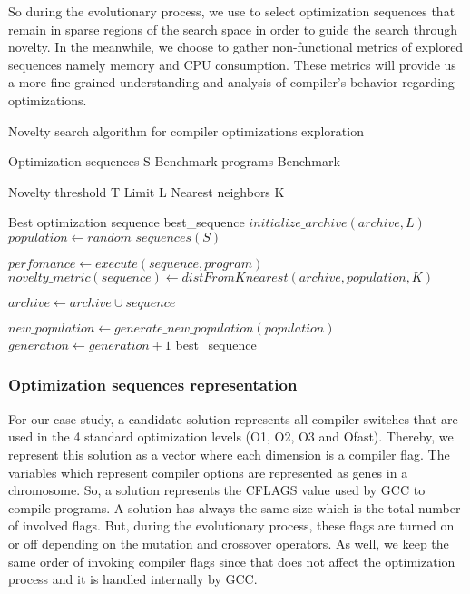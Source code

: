 So during the evolutionary process, we use to select optimization sequences that remain in sparse regions of the search space in order to guide the search through novelty. In the meanwhile, we choose to gather non-functional metrics of explored sequences namely memory and CPU consumption. These metrics will provide us a more fine-grained understanding and analysis of compiler's behavior regarding optimizations. 
\begin{algorithm}
	\caption{Novelty search algorithm for compiler optimizations exploration}
	\label{alg1}
	\begin{algorithmic}[1]
		\REQUIRE Optimization sequences S
		\REQUIRE Benchmark programs Benchmark
		
		\REQUIRE Novelty threshold T
		\REQUIRE Limit L
		\REQUIRE Nearest neighbors K
		
		\ENSURE Best optimization sequence best\_sequence
		\STATE $initialize\_archive(archive,L)$
		\STATE $population \gets random\_sequences(S)$
		\REPEAT
		
		\STATE 	$perfomance \gets execute(sequence,program)$
		\ENDFOR
		\STATE	$novelty\_metric(sequence) \gets distFromKnearest(archive,population,K)$
		
		\STATE	$archive \gets archive \cup sequence$
		\ENDIF
		
		\ENDFOR
		
		\STATE		$new\_population \gets generate\_new\_population(population)$
		\STATE		$generation \gets generation + 1$
		\RETURN best\_sequence
	\end{algorithmic}
\end{algorithm}
\subsubsection{Optimization sequences representation}
For our case study, a candidate solution represents all compiler switches that are used in the 4 standard optimization levels (O1, O2, O3 and Ofast). Thereby, we represent this solution as a vector where each dimension is a compiler flag. The variables which represent compiler options are represented as genes in a chromosome. So, a solution represents the CFLAGS value used by GCC to compile programs.
A solution has always the same size which is the total number of involved flags. But, during the evolutionary process, these flags are turned on or off depending on the mutation and crossover operators. As well, we keep the same order of invoking compiler flags since that does not affect the optimization process and it is handled internally by GCC.

